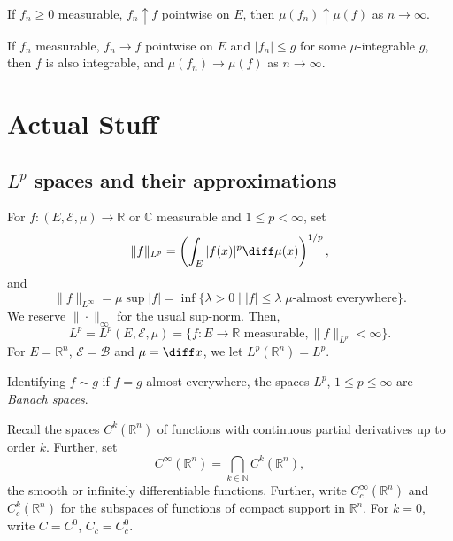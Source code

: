 \documentclass[12pt]{article}
\begin{document}
\begin{theorem}
	If $f_n \geq 0$ measurable, $f_n \uparrow f$ pointwise on $E$, then $\mu(f_n) \uparrow \mu(f)$ as $n \to \infty$.
\end{theorem}

\begin{theorem}
	If $f_n$ measurable, $f_n \to f$ pointwise on $E$ and $|f_n| \leq g$ for some $\mu$-integrable $g$, then $f$ is also integrable, and $\mu(f_n) \to \mu(f)$ as $n \to \infty$.
\end{theorem}

\newpage

\section{Actual Stuff}
\label{sec:act}

\subsection{\texorpdfstring{$L^p$}{L\^p} spaces and their approximations}
\label{sub:lp}

\begin{definition}
	For $f : (E, \mathcal{E}, \mu) \to \mathbb{R}$ or $\mathbb{C}$ measurable and $1 \leq p < \infty$, set
	\[
	\|f\|_{L^p} = \left( \int_E |f(x)|^p \diff \mu(x) \right)^{1/p},
	\]
	and
	\[
		\|f\|_{L^\infty} = \mu \sup|f| = \inf\{ \lambda > 0 \mid |f| \leq \lambda \; \mu\text{-almost everywhere}\}.
	\]
	We reserve $\|\cdot\|_\infty$ for the usual sup-norm. Then,
	\[
		L^p = L^p(E, \mathcal{E}, \mu) = \{f : E \to \mathbb{R} \text{ measurable}, \|f\|_{L^p} < \infty\}.
	\]
	For $E = \mathbb{R}^n$, $\mathcal{E} = \mathcal{B}$ and $\mu = \diff x$, we let $L^p(\mathbb{R}^n) = L^p$.
\end{definition}

\begin{theorem}
	Identifying $f \sim g$ if $f = g$ almost-everywhere, the spaces $L^p$, $1 \leq p \leq \infty$ are \emph{Banach spaces}.
\end{theorem}

Recall the spaces $C^k(\mathbb{R}^n)$ of functions with continuous partial derivatives up to order $k$. Further, set
\[
	C^\infty(\mathbb{R}^n)=  \bigcap_{k \in \mathbb{N}}C^k(\mathbb{R}^n),
\]
the smooth or infinitely differentiable functions. Further, write $C^\infty_c(\mathbb{R}^n)$ and $C^k_c(\mathbb{R}^n)$ for the subspaces of functions of compact support in $\mathbb{R}^n$. For $k = 0$, write $C = C^0$, $C_c = C^0_c$.
\end{document}
